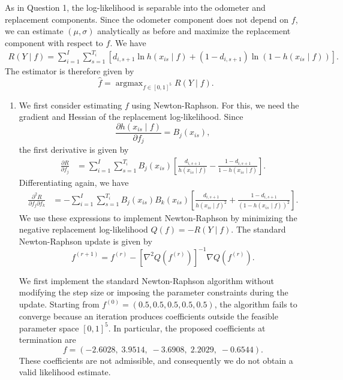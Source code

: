 \documentclass{article}
\begin{document}
As in Question 1, the log-likelihood is separable into the odometer
and replacement components. Since the odometer component does not
depend on $f$, we can estimate $(\mu,\sigma)$ analytically as before
and maximize the replacement component with respect to $f$.
We have
\begin{align*}
    R(Y\mid f)
    = \sum_{i=1}^I\sum_{s=1}^{T_i}
    \left[
        d_{i,s+1}\ln h(x_{is}\mid f)
        +(1-d_{i,s+1})\ln(1-h(x_{is}\mid f))
    \right].
\end{align*}
The estimator is therefore given by
\[
    \hat{f} = \operatorname{argmax}_{f\in[0,1]^5} R(Y\mid f).
\]

\begin{enumerate}

\item[(a)]
We first consider estimating $f$ using Newton-Raphson.
For this, we need the gradient and Hessian of the
replacement log-likelihood. Since
\[
    \frac{\partial h(x_{is}\mid f)}{\partial f_j}
    = B_j(x_{is}),
\]
the first derivative is given by
\begin{align*}
    \frac{\partial R}{\partial f_j}
    &= \sum_{i=1}^I\sum_{s=1}^{T_i}
    B_j(x_{is})
    \left[
        \frac{d_{i,s+1}}{h(x_{is}\mid f)}
        -\frac{1-d_{i,s+1}}{1-h(x_{is}\mid f)}
    \right].
\end{align*}
Differentiating again, we have
\begin{align*}
    \frac{\partial^2 R}{\partial f_j\partial f_k}
    &=-\sum_{i=1}^I\sum_{s=1}^{T_i}
    B_j(x_{is})B_k(x_{is})
    \left[
        \frac{d_{i,s+1}}{h(x_{is}\mid f)^2}
        +\frac{1-d_{i,s+1}}{(1-h(x_{is}\mid f))^2}
    \right].
\end{align*}
We use these expressions to implement Newton-Raphson by
minimizing the negative replacement log-likelihood
$Q(f)=-R(Y\mid f)$. The standard Newton-Raphson update
is given by
\[
    f^{(r+1)}
    = f^{(r)}
    - \left[\nabla^2 Q(f^{(r)})\right]^{-1}
    \nabla Q(f^{(r)}).
\]

We first implement the standard Newton-Raphson algorithm
without modifying the step size or imposing the parameter
constraints during the update. Starting from
$f^{(0)}=(0.5,0.5,0.5,0.5,0.5)$, the algorithm fails to
converge because an iteration produces coefficients outside
the feasible parameter space $[0,1]^5$. In particular,
the proposed coefficients at termination are
\[
    f=(-2.6028,\;3.9514,\;-3.6908,\;2.2029,\;-0.6544).
\]
These coefficients are not admissible, and consequently
we do not obtain a valid likelihood estimate.


\end{enumerate}
\end{document}
